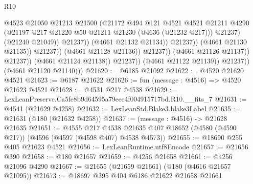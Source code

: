 \begin{lexlean}{R10}
\begin{coremodule}
                                                  @4523
                                                  @21050
                                                  @21213
                                                  @21500
                                                  (@21172
                                                    @494
                                                    @121
                                                    @4521
                                                    @4521
                                                    @21211
                                                    @4290
                                                    (@21197
                                                      @217
                                                      @21220
                                                      @50
                                                      @21211
                                                      @21230
                                                      (@4636 (@21232 @217)))
                                                    @21237)
                                                  (@21240 @21049))
                                                @21237))
                                            (@4661 @21132 @21134))
                                          @21237))
                                      (@4661 @21130 @21135))
                                    @21237))
                                (@4661 @21128 @21136))
                              @21237))
                          (@4661 @21126 @21137))
                        @21237))
                    (@4661 @21124 @21138))
                  @21237))
              (@4661 @21122 @21139))
            @21237))
        (@4661 @21120 @21140)))
@21620 := @6185 @21092
@21622 := @4520 @21620 @4521
@21623 := @6187 @21622
@21626 := fun (message : @4516) => @4520 @21623 @4521
@21628 := @4531 @217 @4538
@21629 := LexLeanPreserve.Ca5fe8b9d64595a79eee4f004915717bd.R10.__fits_7
@21631 := @4541 (@21629 @4258)
@21632 := LexLeanStd.Blake3.blake3Label
@21635 := @21631 (@180 (@21632 @4258))
@21637 := (message : @4516) -> @21628 @21635
@21651 := @4555
    @217
    @4538
    @21635
    @407
    @18652
    (@4580 (@4590 @217))
    (@4596 (@4597 (@4598 @407) @4538 @4573))
@21655 := @18690 @255 @405 @21623 @4521
@21656 := LexLeanRuntime.utf8Encode
@21657 := @21656 @390
@21658 := @180 @21657
@21659 := @4256 @21658
@21661 := @4256 @21096 @4290
@21667 := @21655 (@21659 @21661) (@180 (@4616 @21657 @21095))
@21673 := @18697 @395 @404 @6186 @21622 @21658 @21661

\end{coremodule}
\end{lexlean}
